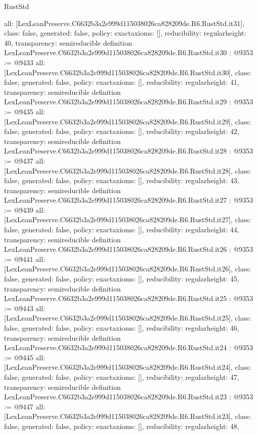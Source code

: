 \begin{lexlean}{RustStd}
\begin{coremodule}
{  all: [LexLeanPreserve.C6632b3a2e999d115038026ca828209de.R6.RustStd.it31],
  class: false,
  generated: false,
  policy: exact{axioms: []},
  reducibility: regular{height: 40},
  transparency: semireducible
}
definition LexLeanPreserve.C6632b3a2e999d115038026ca828209de.R6.RustStd.it30 : @9353 := @9433 {
  all: [LexLeanPreserve.C6632b3a2e999d115038026ca828209de.R6.RustStd.it30],
  class: false,
  generated: false,
  policy: exact{axioms: []},
  reducibility: regular{height: 41},
  transparency: semireducible
}
definition LexLeanPreserve.C6632b3a2e999d115038026ca828209de.R6.RustStd.it29 : @9353 := @9435 {
  all: [LexLeanPreserve.C6632b3a2e999d115038026ca828209de.R6.RustStd.it29],
  class: false,
  generated: false,
  policy: exact{axioms: []},
  reducibility: regular{height: 42},
  transparency: semireducible
}
definition LexLeanPreserve.C6632b3a2e999d115038026ca828209de.R6.RustStd.it28 : @9353 := @9437 {
  all: [LexLeanPreserve.C6632b3a2e999d115038026ca828209de.R6.RustStd.it28],
  class: false,
  generated: false,
  policy: exact{axioms: []},
  reducibility: regular{height: 43},
  transparency: semireducible
}
definition LexLeanPreserve.C6632b3a2e999d115038026ca828209de.R6.RustStd.it27 : @9353 := @9439 {
  all: [LexLeanPreserve.C6632b3a2e999d115038026ca828209de.R6.RustStd.it27],
  class: false,
  generated: false,
  policy: exact{axioms: []},
  reducibility: regular{height: 44},
  transparency: semireducible
}
definition LexLeanPreserve.C6632b3a2e999d115038026ca828209de.R6.RustStd.it26 : @9353 := @9441 {
  all: [LexLeanPreserve.C6632b3a2e999d115038026ca828209de.R6.RustStd.it26],
  class: false,
  generated: false,
  policy: exact{axioms: []},
  reducibility: regular{height: 45},
  transparency: semireducible
}
definition LexLeanPreserve.C6632b3a2e999d115038026ca828209de.R6.RustStd.it25 : @9353 := @9443 {
  all: [LexLeanPreserve.C6632b3a2e999d115038026ca828209de.R6.RustStd.it25],
  class: false,
  generated: false,
  policy: exact{axioms: []},
  reducibility: regular{height: 46},
  transparency: semireducible
}
definition LexLeanPreserve.C6632b3a2e999d115038026ca828209de.R6.RustStd.it24 : @9353 := @9445 {
  all: [LexLeanPreserve.C6632b3a2e999d115038026ca828209de.R6.RustStd.it24],
  class: false,
  generated: false,
  policy: exact{axioms: []},
  reducibility: regular{height: 47},
  transparency: semireducible
}
definition LexLeanPreserve.C6632b3a2e999d115038026ca828209de.R6.RustStd.it23 : @9353 := @9447 {
  all: [LexLeanPreserve.C6632b3a2e999d115038026ca828209de.R6.RustStd.it23],
  class: false,
  generated: false,
  policy: exact{axioms: []},
  reducibility: regular{height: 48},
}
\end{coremodule}
\end{lexlean}
